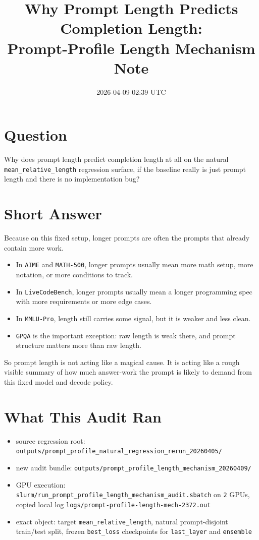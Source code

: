 \documentclass[11pt]{article}
\title{Why Prompt Length Predicts Completion Length:\\Prompt-Profile Length Mechanism Note}
\author{}
\date{2026-04-09 02:39 UTC}
\begin{document}
\maketitle

\section*{Question}
Why does prompt length predict completion length at all on the natural \texttt{mean\_relative\_length} regression surface, if the baseline really is just prompt length and there is no implementation bug?

\section*{Short Answer}
Because on this fixed setup, longer prompts are often the prompts that already contain more work.

\begin{itemize}[leftmargin=1.5em]
\item In \texttt{AIME} and \texttt{MATH-500}, longer prompts usually mean more math setup, more notation, or more conditions to track.
\item In \texttt{LiveCodeBench}, longer prompts usually mean a longer programming spec with more requirements or more edge cases.
\item In \texttt{MMLU-Pro}, length still carries some signal, but it is weaker and less clean.
\item \texttt{GPQA} is the important exception: raw length is weak there, and prompt structure matters more than raw length.
\end{itemize}

So prompt length is not acting like a magical cause. It is acting like a rough visible summary of how much answer-work the prompt is likely to demand from this fixed model and decode policy.

\section*{What This Audit Ran}
\begin{itemize}[leftmargin=1.5em]
\item source regression root: \texttt{outputs/prompt\_profile\_natural\_regression\_rerun\_20260405/}
\item new audit bundle: \texttt{outputs/prompt\_profile\_length\_mechanism\_20260409/}
\item GPU execution: \texttt{slurm/run\_prompt\_profile\_length\_mechanism\_audit.sbatch} on \texttt{2} GPUs, copied local log \texttt{logs/prompt-profile-length-mech-2372.out}
\item exact object: target \texttt{mean\_relative\_length}, natural prompt-disjoint train/test split, frozen \texttt{best\_loss} checkpoints for \texttt{last\_layer} and \texttt{ensemble}
\end{itemize}
\end{document}
